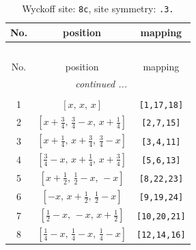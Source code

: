 \documentclass[fleqn,8pt]{jsarticle}
\begin{document}
\renewcommand{\arraystretch}{1.2}
\begin{longtable}{ccc}
\caption{Wyckoff site: {\tt 8c}, site symmetry: {\tt .3.}}
 \\
 \hline \hline
No. & position & mapping \\ \hline \endfirsthead

\multicolumn{2}{l}{\tablename\ \thetable{}} \\
 \hline \hline
No. & position & mapping \\ \hline \endhead

 \hline \hline
\multicolumn{2}{r}{\footnotesize\it continued ...} \\ \endfoot

 \hline \hline
\multicolumn{2}{r}{} \\ \endlastfoot

1 & $\left[ x,\, x,\, x \right]$ & {\tt [1,17,18]} \\ \hline
2 & $\left[ x + \frac{3}{4},\, \frac{3}{4} - x,\, x + \frac{1}{4} \right]$ & {\tt [2,7,15]} \\ \hline
3 & $\left[ x + \frac{1}{4},\, x + \frac{3}{4},\, \frac{3}{4} - x \right]$ & {\tt [3,4,11]} \\ \hline
4 & $\left[ \frac{3}{4} - x,\, x + \frac{1}{4},\, x + \frac{3}{4} \right]$ & {\tt [5,6,13]} \\ \hline
5 & $\left[ x + \frac{1}{2},\, \frac{1}{2} - x,\, - x \right]$ & {\tt [8,22,23]} \\ \hline
6 & $\left[ - x,\, x + \frac{1}{2},\, \frac{1}{2} - x \right]$ & {\tt [9,19,24]} \\ \hline
7 & $\left[ \frac{1}{2} - x,\, - x,\, x + \frac{1}{2} \right]$ & {\tt [10,20,21]} \\ \hline
8 & $\left[ \frac{1}{4} - x,\, \frac{1}{4} - x,\, \frac{1}{4} - x \right]$ & {\tt [12,14,16]} \\
\end{longtable}
\renewcommand{\arraystretch}{1.2}
\end{document}

